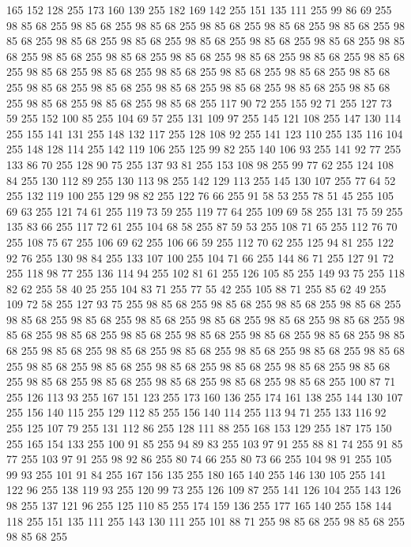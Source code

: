 165 152 128 255 173 160 139 255 182 169 142 255 151 135 111 255 99 86 69 255 98 85 68 255 98 85 68 255 98 85 68 255 98 85 68 255 98 85 68 255 98 85 68 255 98 85 68 255 98 85 68 255 98 85 68 255 98 85 68 255 98 85 68 255 98 85 68 255 98 85 68 255 98 85 68 255 98 85 68 255 98 85 68 255 98 85 68 255 98 85 68 255 98 85 68 255 98 85 68 255 98 85 68 255 98 85 68 255 98 85 68 255 98 85 68 255 98 85 68 255 98 85 68 255 98 85 68 255 98 85 68 255 98 85 68 255 98 85 68 255 98 85 68 255 98 85 68 255 98 85 68 255 98 85 68 255 117 90 72 255 155 92 71 255 127 73 59 255 152 100 85 255 104 69 57 255 131 109 97 255 145 121 108 255 147 130 114 255 155 141 131 255 148 132 117 255 128 108 92 255 141 123 110 255 135 116 104 255 148 128 114 255 142 119 106 255 125 99 82 255 140 106 93 255 141 92 77 255 133 86 70 255 128 90 75 255 137 93 81 255 153 108 98 255 99 77 62 255 124 108 84 255 130 112 89 255
130 113 98 255 142 129 113 255 145 130 107 255 77 64 52 255 132 119 100 255 129 98 82 255 122 76 66 255 91 58 53 255 78 51 45 255 105 69 63 255 121 74 61 255 119 73 59 255 119 77 64 255 109 69 58 255 131 75 59 255 135 83 66 255 117 72 61 255 104 68 58 255 87 59 53 255 108 71 65 255 112 76 70 255 108 75 67 255 106 69 62 255 106 66 59 255 112 70 62 255 125 94 81 255 122 92 76 255 130 98 84 255 133 107 100 255 104 71 66 255 144 86 71 255 127 91 72 255 118 98 77 255 136 114 94 255 102 81 61 255 126 105 85 255 149 93 75 255 118 82 62 255 58 40 25 255 104 83 71 255 77 55 42 255 105 88 71 255 85 62 49 255 109 72 58 255 127 93 75 255 98 85 68 255 98 85 68 255 98 85 68 255 98 85 68 255 98 85 68 255 98 85 68 255 98 85 68 255 98 85 68 255 98 85 68 255 98 85 68 255 98 85 68 255 98 85 68 255 98 85 68 255 98 85 68 255 98 85 68 255 98 85 68 255 98 85 68 255 98 85 68 255 98 85 68 255
98 85 68 255 98 85 68 255 98 85 68 255 98 85 68 255 98 85 68 255 98 85 68 255 98 85 68 255 98 85 68 255 98 85 68 255 98 85 68 255 98 85 68 255 98 85 68 255 98 85 68 255 98 85 68 255 98 85 68 255 100 87 71 255 126 113 93 255 167 151 123 255 173 160 136 255 174 161 138 255 144 130 107 255 156 140 115 255 129 112 85 255 156 140 114 255 113 94 71 255 133 116 92 255 125 107 79 255 131 112 86 255 128 111 88 255 168 153 129 255 187 175 150 255 165 154 133 255 100 91 85 255 94 89 83 255 103 97 91 255 88 81 74 255 91 85 77 255 103 97 91 255 98 92 86 255 80 74 66 255 80 73 66 255 104 98 91 255 105 99 93 255 101 91 84 255 167 156 135 255 180 165 140 255 146 130 105 255 141 122 96 255 138 119 93 255 120 99 73 255 126 109 87 255 141 126 104 255 143 126 98 255 137 121 96 255 125 110 85 255 174 159 136 255 177 165 140 255 158 144 118 255 151 135 111 255 143 130 111 255 101 88 71 255 98 85 68 255 98 85 68 255 98 85 68 255
